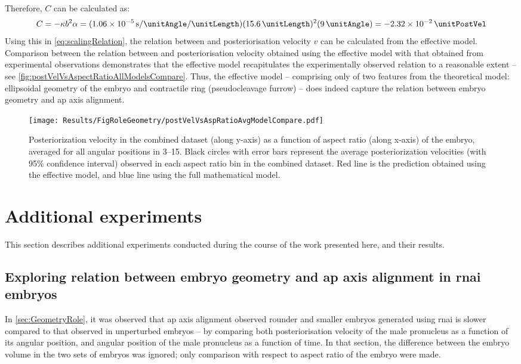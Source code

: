 Therefore, $C$ can be calculated as:
\begin{equation} \label{eq:scalingConst}
    C = -\kappa b^2 \alpha = (\SI{1.06e-5}{\per\second\per\unitAngle\per\unitLength}) (\SI{15.6}{\unitLength})^2 (\SI{9}{\unitAngle}) = \SI{-2.32e-2}{\unitPostVel}
\end{equation}
Using this in \autoref{eq:scalingRelation}, the relation between \aspectRatio and posteriorisation velocity $v$ can be calculated from the effective model. Comparison between the relation between \aspectRatio and posteriorisation velocity obtained using the effective model with that obtained from experimental observations demonstrates that the effective model recapitulates the experimentally observed relation to a reasonable extent -- see \autoref{fig:postVelVsAspectRatioAllModelsCompare}. Thus, the effective model -- comprising only of two features from the theoretical model: ellipsoidal geometry of the embryo and contractile ring (pseudocleavage furrow) -- does indeed capture the relation between embryo geometry and \ac{ap} axis alignment. 

\begin{figure}
    \centering
    \texttt{[image: Results/FigRoleGeometry/postVelVsAspRatioAvgModelCompare.pdf]}
    \caption[Comparison of posteriorisation velocity vs aspect ratio relations]{Posteriorization velocity in the combined dataset (along y-axis) as a function of aspect ratio (along x-axis) of the embryo, averaged for all angular positions in \SIrange{3}{15}{\unitAngle}. Black circles with error bars represent the average posteriorization velocities (with \num{95}\% confidence interval) observed in each aspect ratio bin in the combined dataset. Red line is the prediction obtained using the effective model, and blue line using the full mathematical model.}
    \label{fig:postVelVsAspectRatioAllModelsCompare}
\end{figure}

\FloatBarrier
\section{Additional experiments}\label{sec:additionalExp}
This section describes additional experiments conducted during the course of the work presented here, and their results.

\subsection{Exploring relation between embryo geometry and \acs{ap} axis alignment in  \acs{rnai} embryos}\label{sec:aspectRatioSplitRoundEmbryosIma3}
In \autoref{sec:GeometryRole}, it was observed that \ac{ap} axis alignment observed rounder and smaller embryos generated using  \ac{rnai} is slower compared to that observed in unperturbed embryos -- by comparing both posteriorisation velocity of the male pronucleus as a function of its angular position, and angular position of the male pronucleus as a function of time. In that section, the difference between the embryo volume in the two sets of embryos was ignored; only comparison with respect to aspect ratio of the embryo were made. 

